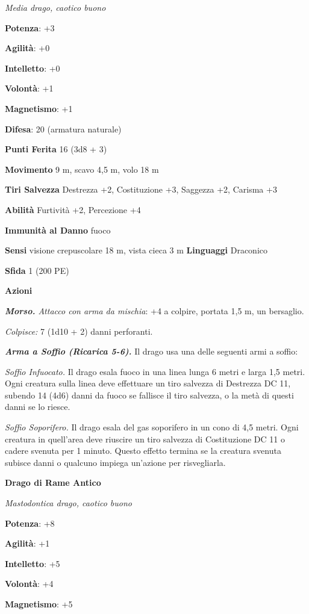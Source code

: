 \begin{multicols}{2}
\emph{Media drago, caotico buono}

\textbf{Potenza}: +3

\textbf{Agilità}: +0

\textbf{Intelletto}: +0

\textbf{Volontà}: +1

\textbf{Magnetismo}: +1

\textbf{Difesa}: 20 (armatura naturale)

\textbf{Punti Ferita} 16 (3d8 + 3)

\textbf{Movimento} 9 m, scavo 4,5 m, volo 18 m

\textbf{Tiri Salvezza} Destrezza +2, Costituzione +3, Saggezza +2,
Carisma +3

\textbf{Abilità} Furtività +2, Percezione +4

\textbf{Immunità al Danno} fuoco

\textbf{Sensi} visione crepuscolare 18 m, vista cieca 3 m
\textbf{Linguaggi} Draconico

\textbf{Sfida} 1 (200 PE)

\textbf{Azioni}

\emph{\textbf{Morso.} Attacco con arma da mischia}: +4 a colpire,
portata 1,5 m, un bersaglio.

\emph{Colpisce:} 7 (1d10 + 2) danni perforanti.

\emph{\textbf{Arma a Soffio (Ricarica 5-6).}} Il drago usa una delle
seguenti armi a soffio:

\emph{Soffio Infuocato.} Il drago esala fuoco in una linea lunga 6 metri
e larga 1,5 metri. Ogni creatura sulla linea deve effettuare un tiro
salvezza di Destrezza DC 11, subendo 14 (4d6) danni da fuoco se fallisce
il tiro salvezza, o la metà di questi danni se lo riesce.

\emph{Soffio Soporifero.} Il drago esala del gas soporifero in un cono
di 4,5 metri. Ogni creatura in quell'area deve riuscire un tiro salvezza
di Costituzione DC 11 o cadere svenuta per 1 minuto. Questo effetto
termina se la creatura svenuta subisce danni o qualcuno impiega
un'azione per risvegliarla.

\textbf{Drago di Rame Antico}

\emph{Mastodontica drago, caotico buono}

\textbf{Potenza}: +8

\textbf{Agilità}: +1

\textbf{Intelletto}: +5

\textbf{Volontà}: +4

\textbf{Magnetismo}: +5


\end{multicols}
